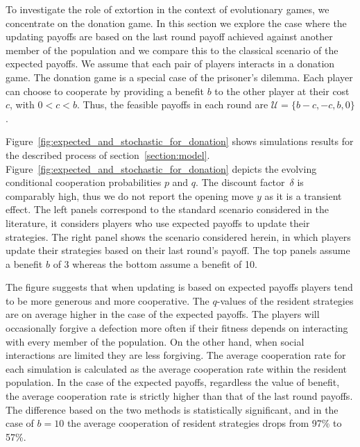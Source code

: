 \documentclass[11pt]{article}
\theoremstyle{plainCl1}
\theoremstyle{plainCl2}
\begin{document}
To investigate the role of extortion in the context of evolutionary games, we
concentrate on the donation game.
In this section we explore the case where the updating payoffs are based on the
last round payoff achieved against another member of the population and we
compare this to the classical scenario of the expected payoffs. We assume that
each pair of players interacts in a donation game. The donation game is a
special case of the prisoner's dilemma. Each player can choose to cooperate by
providing a benefit \(b\) to the other player at their cost \(c\), with \(0 < c
< b\). Thus, the feasible payoffs in each round are \(\mathcal{U} = \{b-c, -c,
b, 0\}\).

Figure~\ref{fig:expected_and_stochastic_for_donation} shows simulations results
for the described process of section~\ref{section:model}.
Figure~\ref{fig:expected_and_stochastic_for_donation} depicts the evolving
conditional cooperation probabilities $p$ and $q$. The discount factor~$\delta$
is comparably high, thus we do not report the opening move \(y\) as it is a
transient effect. The left panels correspond to the standard scenario considered
in the literature, it considers players who use expected payoffs to update their
strategies. The right panel shows the scenario considered herein, in which
players update their strategies based on their last round’s payoff. The top
panels assume a benefit \(b\) of 3 whereas the bottom assume a benefit of 10.

The figure suggests that when updating is based on expected payoffs players tend
to be more generous and more cooperative. The $q$-values of the resident
strategies are on average higher in the case of the expected payoffs. The
players will occasionally forgive a defection more often if their fitness
depends on interacting with every member of the population. On the other hand,
when social interactions are limited they are less forgiving. The average
cooperation rate for each simulation is calculated as the average cooperation
rate within the resident population. In the case of the expected payoffs,
regardless the value of benefit, the average cooperation rate is strictly higher
than that of the last round payoffs. The difference based on the two methods is
statistically significant, and in the case of $b=10$ the average cooperation of
resident strategies drops from 97\% to 57\%.
\end{document}
